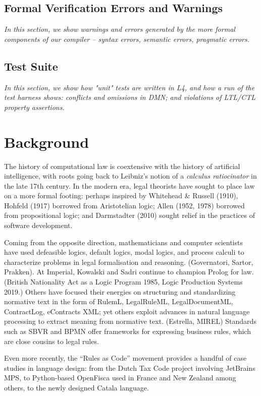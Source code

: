 \documentclass{IOS-Book-Article}
\begin{document}
\subsection{Formal Verification Errors and Warnings}
\textit{In this section, we show warnings and errors generated by the more formal components of our compiler – syntax errors, semantic errors, pragmatic errors.}

\subsection{Test Suite}
\textit{In this section, we show how "unit" tests are written in L4, and how a run of the test harness shows: conflicts and omissions in DMN; and violations of LTL/CTL property assertions.}

\section{Background}

The history of computational law is coextensive with the history of artificial intelligence, with roots going back to Leibniz's notion of a \textit{calculus ratiocinator} in the late 17th century. In the modern era, legal theorists have sought to place law on a more formal footing: perhaps inspired by Whitehead \& Russell (1910), Hohfeld (1917) borrowed from Aristotelian logic; Allen (1952, 1978) borrowed from propositional logic; and Darmstadter (2010) sought relief in the practices of software development. 

Coming from the opposite direction, mathematicians and computer scientists have used defeasible logics, default logics, modal logics, and process calculi to characterize problems in legal formalisation and reasoning. (Governatori, Sartor, Prakken). At Imperial, Kowalski and Sadri continue to champion Prolog for law. (British Nationality Act as a Logic Program 1985, Logic Production Systems 2019.) Others have focused their energies on structuring and standardizing normative text in the form of RulemL, LegalRuleML, LegalDocumentML, ContractLog, eContracts XML; yet others exploit advances in natural language processing to extract meaning from normative text. (Estrella, MIREL) Standards such as SBVR and BPMN offer frameworks for expressing business rules, which are close cousins to legal rules. 

Even more recently, the ``Rules as Code'' movement provides a handful of case studies in language design: from the Dutch Tax Code project involving JetBrains MPS, to Python-based OpenFisca used in France and New Zealand among others, to the newly designed Catala language.
\end{document}
